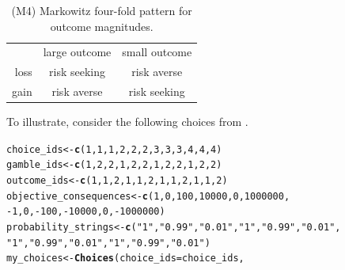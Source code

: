 \documentclass{article}\usepackage[]{graphicx}\usepackage[]{color}
\makeatletter
\newcommand{\hlnum}[1]{\textcolor[rgb]{0.686,0.059,0.569}{#1}}%
\newcommand{\hlstr}[1]{\textcolor[rgb]{0.192,0.494,0.8}{#1}}%
\newcommand{\hlopt}[1]{\textcolor[rgb]{0,0,0}{#1}}%
\newcommand{\hlstd}[1]{\textcolor[rgb]{0.345,0.345,0.345}{#1}}%
\newcommand{\hlkwb}[1]{\textcolor[rgb]{0.69,0.353,0.396}{#1}}%
\newcommand{\hlkwc}[1]{\textcolor[rgb]{0.333,0.667,0.333}{#1}}%
\newcommand{\hlkwd}[1]{\textcolor[rgb]{0.737,0.353,0.396}{\textbf{#1}}}%
\newenvironment{kframe}{%
 \def\at@end@of@kframe{}%
 \ifinner\ifhmode%
  \def\at@end@of@kframe{\end{minipage}}%
  \begin{minipage}{\columnwidth}%
 \fi\fi%
 \def\FrameCommand##1{\hskip\@totalleftmargin \hskip-\fboxsep
 \colorbox{shadecolor}{##1}\hskip-\fboxsep
     \hskip-\linewidth \hskip-\@totalleftmargin \hskip\columnwidth}%
 \MakeFramed {\advance\hsize-\width
   \@totalleftmargin\z@ \linewidth\hsize
   \@setminipage}}%
 {\par\unskip\endMakeFramed%
 \at@end@of@kframe}
\newenvironment{knitrout}{}{} %
\makeatother
\begin{document}
\begin{table}[h]
\caption{(M4) Markowitz four-fold pattern for outcome magnitudes.}
\centering
\begin{tabular}{ r|c|c| }
\multicolumn{1}{r}{}
 &  \multicolumn{1}{c}{large outcome}
 & \multicolumn{1}{c}{small outcome} \\
\cline{2-3}
loss & risk seeking & risk averse \\
\cline{2-3}
gain & risk averse & risk seeking \\
\cline{2-3}
\end{tabular}
\label{markowitz_four_fold_table}
\end{table}

To illustrate, consider the following choices from \cite{Hershey_Schoemaker_1980}.

\begin{knitrout}
\color{fgcolor}\begin{kframe}
\begin{alltt}
\hlstd{choice_ids} \hlkwb{<-} \hlkwd{c}\hlstd{(}\hlnum{1}\hlstd{,} \hlnum{1}\hlstd{,} \hlnum{1}\hlstd{,} \hlnum{2}\hlstd{,} \hlnum{2}\hlstd{,} \hlnum{2}\hlstd{,} \hlnum{3}\hlstd{,} \hlnum{3}\hlstd{,} \hlnum{3}\hlstd{,} \hlnum{4}\hlstd{,} \hlnum{4}\hlstd{,} \hlnum{4}\hlstd{)}
\hlstd{gamble_ids} \hlkwb{<-} \hlkwd{c}\hlstd{(}\hlnum{1}\hlstd{,} \hlnum{2}\hlstd{,} \hlnum{2}\hlstd{,} \hlnum{1}\hlstd{,} \hlnum{2}\hlstd{,} \hlnum{2}\hlstd{,} \hlnum{1}\hlstd{,} \hlnum{2}\hlstd{,} \hlnum{2}\hlstd{,} \hlnum{1}\hlstd{,} \hlnum{2}\hlstd{,} \hlnum{2}\hlstd{)}
\hlstd{outcome_ids} \hlkwb{<-} \hlkwd{c}\hlstd{(}\hlnum{1}\hlstd{,} \hlnum{1}\hlstd{,} \hlnum{2}\hlstd{,} \hlnum{1}\hlstd{,} \hlnum{1}\hlstd{,} \hlnum{2}\hlstd{,} \hlnum{1}\hlstd{,} \hlnum{1}\hlstd{,} \hlnum{2}\hlstd{,} \hlnum{1}\hlstd{,} \hlnum{1}\hlstd{,} \hlnum{2}\hlstd{)}
\hlstd{objective_consequences} \hlkwb{<-} \hlkwd{c}\hlstd{(}\hlnum{1}\hlstd{,} \hlnum{0}\hlstd{,} \hlnum{100}\hlstd{,} \hlnum{10000}\hlstd{,} \hlnum{0}\hlstd{,} \hlnum{1000000}\hlstd{,}
        \hlopt{-}\hlnum{1}\hlstd{,} \hlnum{0}\hlstd{,} \hlopt{-}\hlnum{100}\hlstd{,} \hlopt{-}\hlnum{10000}\hlstd{,} \hlnum{0}\hlstd{,} \hlopt{-}\hlnum{1000000}\hlstd{)}
\hlstd{probability_strings} \hlkwb{<-} \hlkwd{c}\hlstd{(}\hlstr{"1"}\hlstd{,} \hlstr{"0.99"}\hlstd{,} \hlstr{"0.01"}\hlstd{,} \hlstr{"1"}\hlstd{,} \hlstr{"0.99"}\hlstd{,} \hlstr{"0.01"}\hlstd{,}
        \hlstr{"1"}\hlstd{,} \hlstr{"0.99"}\hlstd{,} \hlstr{"0.01"}\hlstd{,} \hlstr{"1"}\hlstd{,} \hlstr{"0.99"}\hlstd{,} \hlstr{"0.01"}\hlstd{)}
\hlstd{my_choices} \hlkwb{<-} \hlkwd{Choices}\hlstd{(}\hlkwc{choice_ids}\hlstd{=choice_ids,}

\end{alltt}
\end{kframe}
\end{knitrout}
\end{document}
